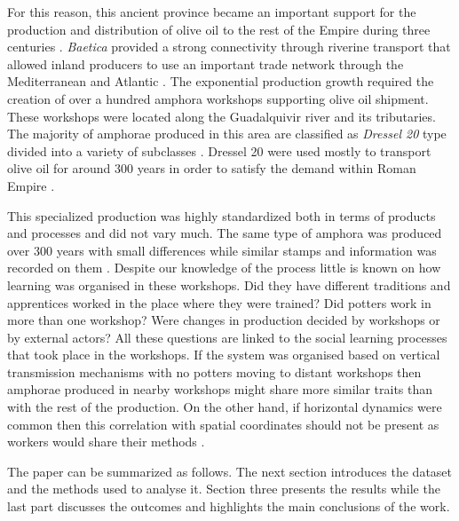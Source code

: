 \documentclass[review]{elsarticle}
\begin{document}
For this reason, this ancient province became an important support for the production and distribution of olive oil to the rest of the Empire during three centuries \citep{chic2005comercio, millet_anforas_1998, rodriguez_baetican_1998}. \emph{Baetica} provided a strong connectivity through riverine transport that allowed inland producers to use an important trade network through the Mediterranean and Atlantic \citep{garcia_vargas_enrique_formal_2010}. The exponential production growth required the creation of over a hundred amphora workshops supporting olive oil shipment. These workshops were located along the Guadalquivir river and its tributaries. The majority of amphorae produced in this area are classified as \emph{Dressel 20} type divided into a variety of subclasses \citep{berni_millet_epigrafianforica_2008, martin-kilcher_romischen_1994}. Dressel 20 were used mostly to transport olive oil for around 300 years in order to satisfy the demand within Roman Empire \citep{rodriguez_economioleicola_1977}. 

This specialized production was highly standardized both in terms of products and processes and did not vary much. The same type of amphora was produced over 300 years with small differences while similar stamps and information was recorded on them \cite{coto-sarmiento_maria_bayesian_????}. Despite our knowledge of the process little is known on how learning was organised in these workshops. Did they have different traditions and apprentices worked in the place where they were trained? Did potters work in more than one workshop? Were changes in production decided by workshops or by external actors? All these questions are linked to the social learning processes that took place in the workshops. If the system was organised based on vertical transmission mechanisms with no potters moving to distant workshops then amphorae produced in nearby workshops might share more similar traits than with the rest of the production. On the other hand, if horizontal dynamics were common then this correlation with spatial coordinates should not be present as workers would share their methods \citep{hosfield_modes_2009}. 

The paper can be summarized as follows. The next section introduces the dataset and the methods used to analyse it. Section three presents the results while the last part discusses the outcomes and highlights the main conclusions of the work. 
\end{document}
